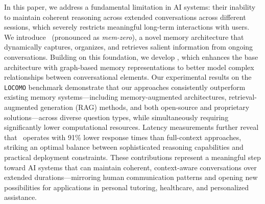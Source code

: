 In this paper, we address a fundamental limitation in AI systems: their inability to maintain coherent reasoning across extended conversations across different sessions, which severely restricts meaningful long-term interactions with users. We introduce \mem~(pronounced as \emph{mem-zero}), a novel memory architecture that dynamically captures, organizes, and retrieves salient information from ongoing conversations. Building on this foundation, we develop \memp, which enhances the base architecture with graph-based memory representations to better model complex relationships between conversational elements. 
Our experimental results on the \texttt{LOCOMO} benchmark demonstrate that our approaches consistently outperform existing memory systems—including memory-augmented architectures, retrieval-augmented generation (RAG) methods, and both open-source and proprietary solutions—across diverse question types, while simultaneously requiring significantly lower computational resources.
Latency measurements further reveal that \mem~operates with 91\% lower response times than full-context approaches, striking an optimal balance between sophisticated reasoning capabilities and practical deployment constraints. These contributions represent a meaningful step toward AI systems that can maintain coherent, context-aware conversations over extended durations—mirroring human communication patterns and opening new possibilities for applications in personal tutoring, healthcare, and personalized assistance.